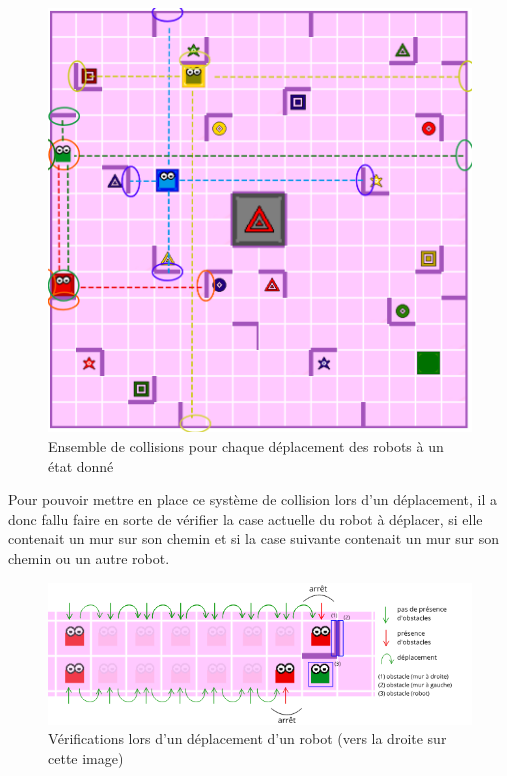 \documentclass[a4paper, 12pt]{article}
\begin{document}
        
         \begin{figure}[H]
            \centering
            \includegraphics[scale=0.25]{images/collision.png}
            \caption{Ensemble de collisions pour chaque déplacement des robots à un état donné}
        \end{figure}
        
        Pour pouvoir mettre en place ce système de collision lors d'un déplacement, il a donc fallu faire en sorte de vérifier la case actuelle du robot à déplacer, si elle contenait un mur sur son chemin et si la case suivante contenait un mur sur son chemin ou un autre robot.
        
        \begin{figure}[H]
            \centering
            \includegraphics[scale=0.7]{images/deplacements.png}
            \caption{Vérifications lors d'un déplacement d'un robot (vers la droite sur cette image)}
        \end{figure}
        
\end{document}
